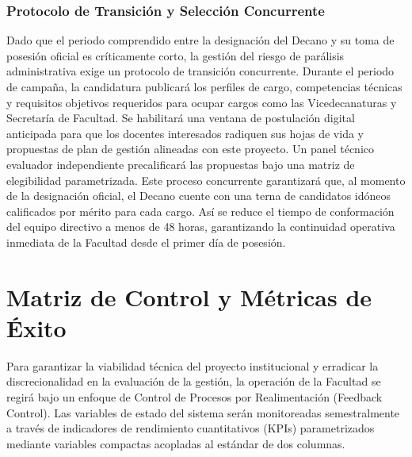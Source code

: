 \documentclass[journal,10pt,twocolumn,letterpaper]{IEEEtran}
\begin{document}
\subsubsection{Protocolo de Transición y Selección Concurrente}
Dado que el periodo comprendido entre la designación del Decano y su toma de posesión oficial es críticamente corto, la gestión del riesgo de parálisis administrativa exige un protocolo de transición concurrente. Durante el periodo de campaña, la candidatura publicará los perfiles de cargo, competencias técnicas y requisitos objetivos requeridos para ocupar cargos como las Vicedecanaturas y Secretaría de Facultad. Se habilitará una ventana de postulación digital anticipada para que los docentes interesados radiquen sus hojas de vida y propuestas de plan de gestión alineadas con este proyecto. Un panel técnico evaluador independiente precalificará las propuestas bajo una matriz de elegibilidad parametrizada. Este proceso concurrente garantizará que, al momento de la designación oficial, el Decano cuente con una terna de candidatos idóneos calificados por mérito para cada cargo. Así se reduce el tiempo de conformación del equipo directivo a menos de 48 horas, garantizando la continuidad operativa inmediata de la Facultad desde el primer día de posesión.

\section{Matriz de Control y Métricas de Éxito}
Para garantizar la viabilidad técnica del proyecto institucional y erradicar la discrecionalidad en la evaluación de la gestión, la operación de la Facultad se regirá bajo un enfoque de Control de Procesos por Realimentación (Feedback Control). Las variables de estado del sistema serán monitoreadas semestralmente a través de indicadores de rendimiento cuantitativos (KPIs) parametrizados mediante variables compactas acopladas al estándar de dos columnas.
\end{document}
